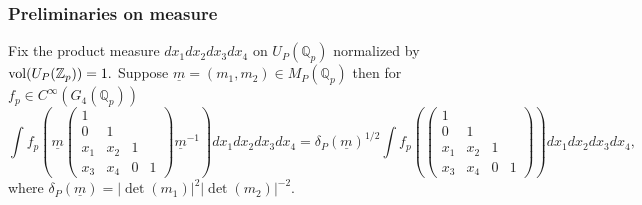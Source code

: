 \documentclass[11pt]{amsart}
\begin{document}
\subsubsection{Preliminaries on measure}
Fix the product measure $dx_1 dx_2 dx_3 dx_4$ on $U_P(\mathbb{Q}_p)$ normalized by ${\rm vol}(U_P(\mathbb{Z}_p)) = 1.$ 
Suppose $\underline{m} =(m_1,m_2) \in M_P(\mathbb{Q}_p)$ then for $f_p \in C^{\infty}(G_4(\mathbb{Q}_p))$
\begin{equation}
\int f_p\left(\underline{m} \left(\begin{smallmatrix}
		1 & & & \\
		0 & 1 & & \\
		x_1 & x_2 & 1 & \\
		x_3 & x_4 & 0 & 1
	\end{smallmatrix}\right) \underline{m}^{-1}\right) dx_1dx_2 dx_3 dx_4 = \delta_P(\underline{m})^{1/2} \int f_p\left(\left(\begin{smallmatrix}
		1 & & & \\
		0 & 1 & & \\
		x_1 & x_2 & 1 & \\
		x_3 & x_4 & 0 & 1
	\end{smallmatrix}\right)\right)dx_1dx_2 dx_3 dx_4, \label{eqn: conjuagation-by-levi}
\end{equation}
where $\delta_P(\underline{m}) = |\det(m_1)|^2 |\det(m_2)|^{-2}.$
\end{document}
